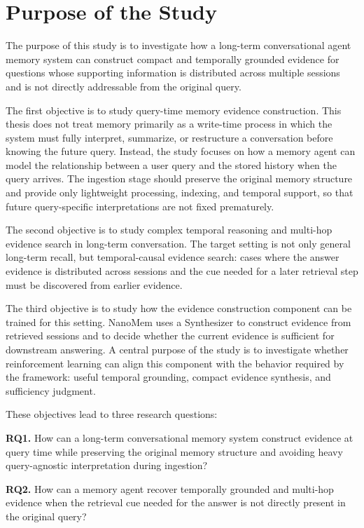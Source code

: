 \section{Purpose of the Study}
\label{sec:intro-purpose}

The purpose of this study is to investigate how a long-term conversational
agent memory system can construct compact and temporally grounded evidence for
questions whose supporting information is distributed across multiple sessions
and is not directly addressable from the original query.

The first objective is to study query-time memory evidence construction. This
thesis does not treat memory primarily as a write-time process in which the
system must fully interpret, summarize, or restructure a conversation before
knowing the future query. Instead, the study focuses on how a memory agent can
model the relationship between a user query and the stored history when the
query arrives. The ingestion stage should preserve the original memory structure
and provide only lightweight processing, indexing, and temporal support, so that
future query-specific interpretations are not fixed prematurely.

The second objective is to study complex temporal reasoning and multi-hop
evidence search in long-term conversation. The target setting is not only
general long-term recall, but temporal-causal evidence search: cases where the
answer evidence is distributed across sessions and the cue needed for a later
retrieval step must be discovered from earlier evidence.

The third objective is to study how the evidence construction component can be
trained for this setting. NanoMem uses a Synthesizer to construct evidence from
retrieved sessions and to decide whether the current evidence is sufficient for
downstream answering. A central purpose of the study is to investigate whether
reinforcement learning can align this component with the behavior required by
the framework: useful temporal grounding, compact evidence synthesis, and
sufficiency judgment.

These objectives lead to three research questions:

\textbf{RQ1.} How can a long-term conversational memory system construct
evidence at query time while preserving the original memory structure and
avoiding heavy query-agnostic interpretation during ingestion?

\textbf{RQ2.} How can a memory agent recover temporally grounded and multi-hop
evidence when the retrieval cue needed for the answer is not directly present
in the original query?

